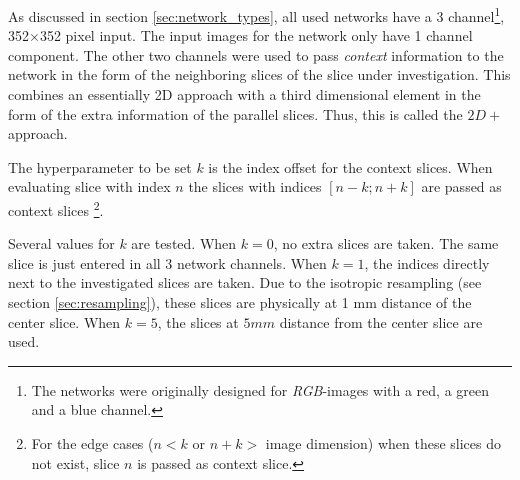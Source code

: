 As discussed in section \ref{sec:network_types}, all used networks have a 3 channel\footnote{The networks were originally designed for \textit{RGB}-images with a red, a green and a blue channel.}, 
352$\times$352 pixel input. 
The input images for the network only have 1 channel component. 
The other two channels were used to pass \textit{context} information to the network in the form of the neighboring slices of the slice under investigation.
This combines an essentially 2D approach with a third dimensional element in the form of the extra information of the parallel slices. Thus, this is called the $2D+$ approach.


The hyperparameter to be set $k$ is the index offset for the context slices.
When evaluating slice with index $n$ the slices with indices $\left[n-k; n+k\right]$ are passed as context slices
\footnote{For the edge cases ($n<k$ or $n+k>$ image dimension) when these slices do not exist, slice $n$ is passed as context slice.}.


Several values for $k$ are tested. When $k=0$, no extra slices are taken. The same slice is just entered in all 3 network channels. When $k=1$, the indices directly next to the investigated slices are taken.
Due to the isotropic resampling (see section \ref{sec:resampling}), these slices are physically at 1 mm distance of the center slice. When $k=5$, the slices at $5 mm$ distance from the center slice are used.

